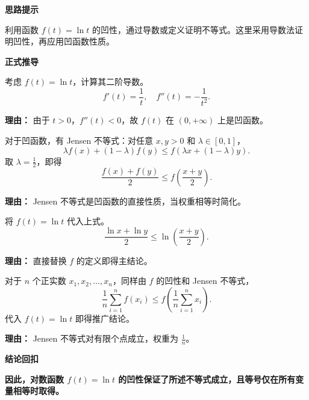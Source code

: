 \begin{proofbox}
\textbf{\textcolor{CProof}{思路提示}}

利用函数 $f(t) = \ln t$ 的凹性，通过导数或定义证明不等式。这里采用导数法证明凹性，再应用凹函数性质。

\medskip
\textbf{\textcolor{CProof}{正式推导}}
\begin{description}[style=nextline, leftmargin=2.8em, labelsep=0.5em, itemsep=0.55em]
    \item[\textbf{步骤一（函数凹性）：}] 考虑 $f(t) = \ln t$，计算其二阶导数。
    \[
    f'(t) = \frac{1}{t}, \quad f''(t) = -\frac{1}{t^2}.
    \]
    \par\textbf{理由：}
    由于 $t > 0$，$f''(t) < 0$，故 $f(t)$ 在 $(0, +\infty)$ 上是凹函数。

    \item[\textbf{步骤二（凹函数性质）：}] 对于凹函数，有 Jensen 不等式：对任意 $x, y > 0$ 和 $\lambda \in [0,1]$，
    \[
    \lambda f(x) + (1-\lambda) f(y) \leq f(\lambda x + (1-\lambda) y).
    \]
    取 $\lambda = \frac{1}{2}$，即得
    \[
    \frac{f(x) + f(y)}{2} \leq f\!\left( \frac{x+y}{2} \right).
    \]
    \par\textbf{理由：}
    Jensen 不等式是凹函数的直接性质，当权重相等时简化。

    \item[\textbf{步骤三（代入函数）：}] 将 $f(t) = \ln t$ 代入上式。
    \[
    \frac{\ln x + \ln y}{2} \leq \ln\!\left( \frac{x+y}{2} \right).
    \]
    \par\textbf{理由：}
    直接替换 $f$ 的定义即得主结论。

    \item[\textbf{步骤四（推广证明）：}] 对于 $n$ 个正实数 $x_1, x_2, \dots, x_n$，同样由 $f$ 的凹性和 Jensen 不等式，
    \[
    \frac{1}{n} \sum_{i=1}^{n} f(x_i) \leq f\!\left( \frac{1}{n} \sum_{i=1}^{n} x_i \right).
    \]
    代入 $f(t) = \ln t$ 即得推广结论。
    \par\textbf{理由：}
    Jensen 不等式对有限个点成立，权重为 $\frac{1}{n}$。
\end{description}

\medskip
\textbf{\textcolor{CProof}{结论回扣}}

\textbf{因此，对数函数 $f(t)=\ln t$ 的凹性保证了所述不等式成立，且等号仅在所有变量相等时取得。}
\end{proofbox}
